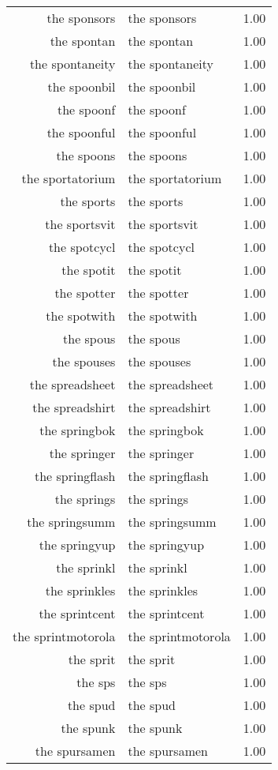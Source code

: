 \begin{table}[ht]
\begin{tabular}{rlr}
  the sponsors & the sponsors & 1.00 \\ 
  the spontan & the spontan & 1.00 \\ 
  the spontaneity & the spontaneity & 1.00 \\ 
  the spoonbil & the spoonbil & 1.00 \\ 
  the spoonf & the spoonf & 1.00 \\ 
  the spoonful & the spoonful & 1.00 \\ 
  the spoons & the spoons & 1.00 \\ 
  the sportatorium & the sportatorium & 1.00 \\ 
  the sports & the sports & 1.00 \\ 
  the sportsvit & the sportsvit & 1.00 \\ 
  the spotcycl & the spotcycl & 1.00 \\ 
  the spotit & the spotit & 1.00 \\ 
  the spotter & the spotter & 1.00 \\ 
  the spotwith & the spotwith & 1.00 \\ 
  the spous & the spous & 1.00 \\ 
  the spouses & the spouses & 1.00 \\ 
  the spreadsheet & the spreadsheet & 1.00 \\ 
  the spreadshirt & the spreadshirt & 1.00 \\ 
  the springbok & the springbok & 1.00 \\ 
  the springer & the springer & 1.00 \\ 
  the springflash & the springflash & 1.00 \\ 
  the springs & the springs & 1.00 \\ 
  the springsumm & the springsumm & 1.00 \\ 
  the springyup & the springyup & 1.00 \\ 
  the sprinkl & the sprinkl & 1.00 \\ 
  the sprinkles & the sprinkles & 1.00 \\ 
  the sprintcent & the sprintcent & 1.00 \\ 
  the sprintmotorola & the sprintmotorola & 1.00 \\ 
  the sprit & the sprit & 1.00 \\ 
  the sps & the sps & 1.00 \\ 
  the spud & the spud & 1.00 \\ 
  the spunk & the spunk & 1.00 \\ 
  the spursamen & the spursamen & 1.00 \\ 

\end{tabular}
\end{table}
